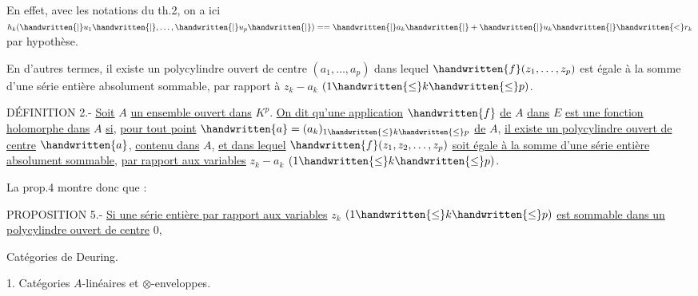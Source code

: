 En effet, avec les notations du th.2, on a ici $h_k(\handwritten{|}u_1\handwritten{|},\ldots,\handwritten{|}u_p\handwritten{|})==\handwritten{|}a_k\handwritten{|}+\handwritten{|}u_k\handwritten{|}\handwritten{<}r_k$ par hypothèse.

En d'autres termes, il existe un polycylindre ouvert de centre $(a_1,\ldots,a_p)$ dans lequel $\handwritten{f}(z_1,\ldots,z_p)$ est égale à la somme d'une série entière absolument sommable, par rapport à $z_k-a_k$ $(1\handwritten{\leq}k\handwritten{\leq}p)$.

DÉFINITION 2.- \uline{Soit} $A$ \uline{un ensemble ouvert dans} ${K}^{p}$. \uline{On dit qu'une application} $\handwritten{f}$ \uline{de} $A$ \uline{dans} $E$ \uline{est une fonction holomorphe dans} $A$ \uline{si}, \uline{pour tout point} $\handwritten{a}=(a_k)_{1\handwritten{\leq}k\handwritten{\leq}p}$ \uline{de} $A$, \uline{il existe un polycylindre ouvert de centre} $\handwritten{a}$, \uline{contenu dans} $A$, \uline{et dans lequel} $\handwritten{f}(z_1,z_2,\ldots,z_p)$ \uline{soit égale à la somme d'une série entière absolument sommable}, \uline{par rapport aux variables} $z_k-a_k$ $(1\handwritten{\leq}k\handwritten{\leq}p)$.

La prop.4 montre donc que :

PROPOSITION 5.- \uline{Si une série entière par rapport aux variables} $z_k$ $(1\handwritten{\leq}k\handwritten{\leq}p)$ \uline{est sommable dans un polycylindre ouvert de centre} $0$,


Catégories de Deuring.

1. Catégories $A$-linéaires et $\otimes$-enveloppes.

